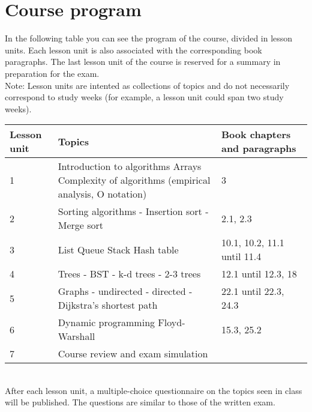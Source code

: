 \section{Course program}
	
	In the following table you can see the program of the course, divided in lesson units. Each lesson unit is also associated with the corresponding book paragraphs. The last lesson unit of the course is reserved for a summary in preparation for the exam. \\
	Note: Lesson units are intented as collections of topics and do not necessarily correspond to study weeks (for example, a lesson unit could span two study weeks). \\
	
	\begin{tabular}{ | p{1.2cm} | p{10cm} | p{2.7cm} | }
		\hline
	  	\textbf{Lesson unit} & \textbf{Topics} & \textbf{Book chapters and paragraphs} \\
	  	\hline
  		1 & Introduction to algorithms \newline Arrays \newline Complexity of algorithms (empirical analysis, O notation) & 3 \\
  		\hline
  		2 & Sorting algorithms \newline - Insertion sort \newline - Merge sort & 2.1, 2.3 \\
  		\hline
  		3 & List \newline Queue \newline Stack \newline Hash table &  10.1, 10.2, 11.1 until 11.4 \\
  		\hline
  		4 & Trees \newline - BST \newline - k-d trees \newline - 2-3 trees & 12.1 until 12.3, 18 \\
  		\hline
  		5 & Graphs \newline - undirected \newline - directed \newline - Dijkstra's shortest path & 22.1 until 22.3, 24.3 \\
  		\hline
  		6 & Dynamic programming \newline Floyd-Warshall & 15.3, 25.2\\
  		\hline
  		7 & Course review and exam simulation & \\
  		\hline
	\end{tabular}
\begin{comment}
  		4 & Binary search trees & 3.2 \\
  		\hline
  		5 & Balanced search trees: 2-3 search trees & 3.3 \\
  		\hline
  		6 & Graphs (undirected; directed; Dijkstra shortest path) & 4.1, 4.2, 4.4 \\
  		\hline
  		7 & Dynamic programming; Floyd-Warshall & Not covered by the book, see slides or Cormen\\
  		\hline
  		8 & Course recap & \\
  		\hline
\end{comment}

\noindent
\\
After each lesson unit, a multiple-choice questionnaire on the topics seen in class will be published. The questions are similar to those of the written exam.